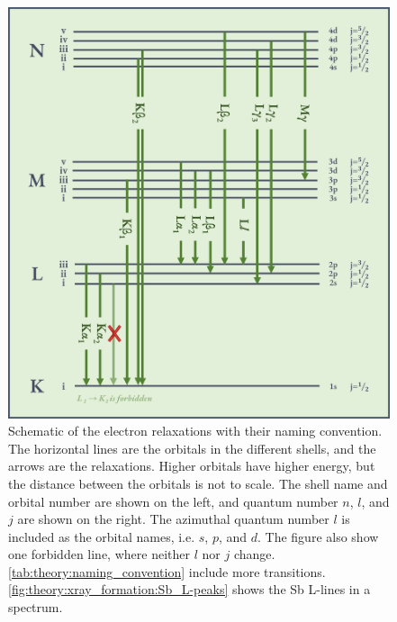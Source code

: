 \begin{figure}[p]
    \centering
    \includegraphics[width=0.95\linewidth]{figures/transition_lines.png}
    \caption{
        Schematic of the electron relaxations with their naming convention.
        The horizontal lines are the orbitals in the different shells, and the arrows are the relaxations.
        Higher orbitals have higher energy, but the distance between the orbitals is not to scale.
        The shell name and orbital number are shown on the left, and quantum number $n$, $l$, and $j$ are shown on the right.
        The azimuthal quantum number $l$ is included as the orbital names, i.e. $s$, $p$, and $d$.
        The figure also show one forbidden line, where neither $l$ nor $j$ change.
        \cref{tab:theory:naming_convention} include more transitions.
        \cref{fig:theory:xray_formation:Sb_L-peaks} shows the Sb L-lines in a spectrum.
    }
    \label{fig:theory:xray_formation:lines}
\end{figure}




